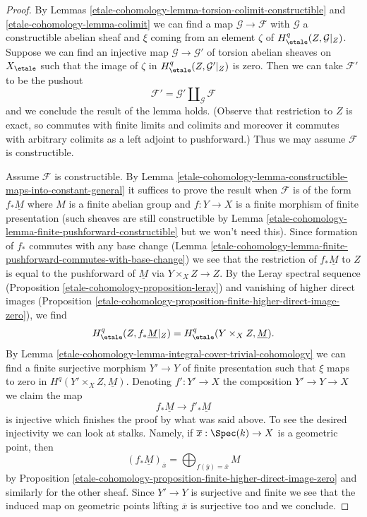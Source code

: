 \begin{proof}
By Lemmas \ref{etale-cohomology-lemma-torsion-colimit-constructible} and \ref{etale-cohomology-lemma-colimit}
we can find a map $\mathcal{G} \to \mathcal{F}$ with $\mathcal{G}$
a constructible abelian sheaf and $\xi$ coming from an element $\zeta$ of
$H^q_\etale(Z, \mathcal{G}|_Z)$. Suppose we can find an injective map
$\mathcal{G} \to \mathcal{G}'$ of torsion abelian sheaves on $X_\etale$
such that the image of $\zeta$ in $H^q_\etale(Z, \mathcal{G}'|_Z)$ is zero.
Then we can take $\mathcal{F}'$ to be the pushout
$$
\mathcal{F}' = \mathcal{G}' \amalg_{\mathcal{G}} \mathcal{F}
$$
and we conclude the result of the lemma holds. (Observe that restriction
to $Z$ is exact, so commutes with finite limits and colimits and moreover
it commutes with arbitrary colimits as a left adjoint to pushforward.)
Thus we may assume $\mathcal{F}$ is constructible.

\medskip\noindent
Assume $\mathcal{F}$ is constructible. By
Lemma \ref{etale-cohomology-lemma-constructible-maps-into-constant-general}
it suffices to prove the result when $\mathcal{F}$
is of the form $f_*\underline{M}$ where $M$ is a finite abelian group
and $f : Y \to X$ is a finite morphism of finite presentation
(such sheaves are still constructible by
Lemma \ref{etale-cohomology-lemma-finite-pushforward-constructible}
but we won't need this).
Since formation of $f_*$ commutes with any base change
(Lemma \ref{etale-cohomology-lemma-finite-pushforward-commutes-with-base-change})
we see that the restriction of $f_*\underline{M}$ to $Z$ is
equal to the pushforward of $\underline{M}$ via
$Y \times_X Z \to Z$. By the Leray spectral sequence
(Proposition \ref{etale-cohomology-proposition-leray})
and vanishing of higher direct images
(Proposition \ref{etale-cohomology-proposition-finite-higher-direct-image-zero}),
we find
$$
H^q_\etale(Z, f_*\underline{M}|_Z) = H^q_\etale(Y \times_X Z, \underline{M}).
$$
By Lemma \ref{etale-cohomology-lemma-integral-cover-trivial-cohomology}
we can find a finite surjective morphism $Y' \to Y$ of finite presentation
such that $\xi$ maps to zero in $H^q(Y' \times_X Z, \underline{M})$.
Denoting $f' : Y' \to X$ the composition $Y' \to Y \to X$ we claim
the map
$$
f_*\underline{M} \longrightarrow f'_*\underline{M}
$$
is injective which finishes the proof by what was said above.
To see the desired injectivity we can look at stalks. Namely,
if $\overline{x} : \Spec(k) \to X$ is a geometric point, then
$$
(f_*\underline{M})_{\overline{x}} =
\bigoplus\nolimits_{f(\overline{y}) = \overline{x}} M
$$
by Proposition \ref{etale-cohomology-proposition-finite-higher-direct-image-zero}
and similarly for the other sheaf.
Since $Y' \to Y$ is surjective and finite we see that
the induced map on geometric points lifting $\overline{x}$ is
surjective too and we conclude.
\end{proof}

